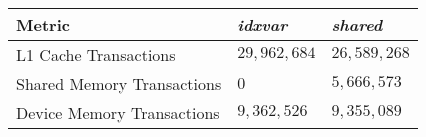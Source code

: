 \begin{table}
	\begin{tabular}{l l l}
		\hline
		\textbf{Metric} & \textbf{\emph{idxvar}} & \textbf{\emph{shared}} \\
		\hline
		\hline
		L1 Cache Transactions & $29,962,684$ & $26,589,268$ \\
		Shared Memory Transactions & $0$ & $5,666,573$ \\
		Device Memory Transactions & $9,362,526$ & $9,355,089$ \\

\end{tabular}
\end{table}
